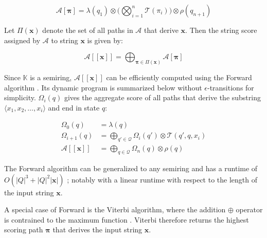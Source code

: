 \begin{equation}
  \mathcal{A}[\pmb{\pi}] = \lambda(q_1) \otimes \Bigg( \bigotimes_{i=1}^n \mathcal{T}(\pi_i) \Bigg) \otimes \rho(q_{n+1})
\end{equation}

\begin{definition}

Let $\Pi(\pmb{x})$ denote the set of all paths in $\mathcal{A}$ that derive $\pmb{x}$. Then the string score assigned by $\mathcal{A}$ to string $\pmb{x}$ is given by:
  
\end{definition}

\begin{equation}
  \mathcal{A}[\![\pmb{x}]\!] = \bigoplus_{\pmb{\pi} \in \Pi(\pmb{x})} \mathcal{A}[\pmb{\pi}]
\end{equation}

\begin{remark}
  Since $\mathbb{K}$ is a semiring, $\mathcal{A}[\![\pmb{x}]\!]$ can be efficiently computed using the Forward algorithm \citep{baum1966statistical}. Its dynamic program is summarized below without $\epsilon$-transitions for simplicity. $\Omega_i(q)$ gives the aggregate score of all paths that derive the substring $\langle x_1, x_2, \dots, x_i \rangle$ and end in state $q$:
 
\begin{subequations}
  \begin{align}
    \Omega_0(q) &= \lambda(q) \\
    \Omega_{i+1}(q) &= \bigoplus_{q' \in \mathcal{Q}} \Omega_i(q') \otimes \mathcal{T}(q',q,x_i)  \\
    \mathcal{A}[\![\pmb{x}]\!] &= \bigoplus_{q \in \mathcal{Q}} \Omega_n(q) \otimes \rho(q)
  \end{align}
\end{subequations}

\end{remark}

\begin{remark}
  The Forward algorithm can be generalized to any semiring \citep{eisner2002parameter} and has a runtime of $O(|Q|^3 + |Q|^2|\pmb{x}|)$ \citep{schwartz2018sopa}; notably with a linear runtime with respect to the length of the input string $\pmb{x}$.
\end{remark}

\begin{remark}
  A special case of Forward is the Viterbi algorithm, where the addition $\oplus$ operator is contrained to the maximum function \citep{viterbi1967error}. Viterbi therefore returns the highest scoring path $\pmb{\pi}$ that derives the input string $\pmb{x}$.
\end{remark}

